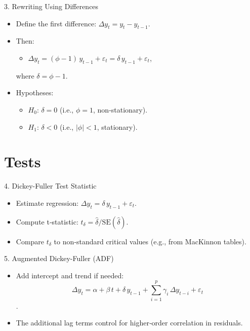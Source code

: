 \documentclass[aspectratio=169]{beamer}
\begin{document}
\begin{frame}[label={sec:org882d165}]{3. Rewriting Using Differences}
\begin{itemize}
\item Define the first difference:  \(\Delta y_t = y_t - y_{t-1}\).
\item Then:  
\begin{itemize}
\item \(\Delta y_t = (\phi - 1)\,y_{t-1} + \varepsilon_t =
      \delta\,y_{t-1} + \varepsilon_t\),
\end{itemize}
where \(\delta = \phi - 1\).
\item Hypotheses:  
\begin{itemize}
\item \(H_0\): \(\delta = 0\) (i.e., \(\phi = 1\),
non‑stationary).
\item \(H_1\): \(\delta < 0\) (i.e., \(|\phi| < 1\),
stationary).
\end{itemize}
\end{itemize}
\end{frame}

\section{Tests}
\label{sec:org30a5550}
\begin{frame}[label={sec:orgc863dd1}]{4. Dickey-Fuller Test Statistic}
\begin{itemize}
\item Estimate regression: \(\Delta y_t = \delta\,y_{t-1} +
    \varepsilon_t\).

\item Compute t‑statistic: \(t_\delta = \widehat\delta / \mathrm{SE}(\widehat\delta)\).
\item Compare \(t_\delta\) to non‑standard critical values (e.g., from
MacKinnon tables).
\end{itemize}
\end{frame}

\begin{frame}[label={sec:org6efc78e}]{5. Augmented Dickey-Fuller (ADF)}
\begin{itemize}
\item Add intercept and trend if needed:  
\[
    \Delta y_t = \alpha + \beta\,t + \delta\,y_{t-1} + \sum_{i=1}^p \gamma_i\,\Delta y_{t-i} + \varepsilon_t
    \].
\item The additional lag terms control for higher‑order correlation in
residuals.
\end{itemize}
\end{frame}
\end{document}
